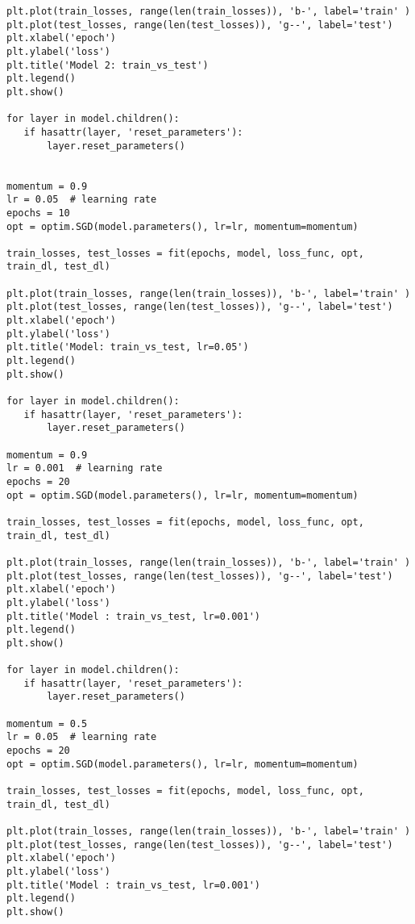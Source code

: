 \documentclass[12pt]{article}%
\begin{document}
\begin{lstlisting}
plt.plot(train_losses, range(len(train_losses)), 'b-', label='train' )
plt.plot(test_losses, range(len(test_losses)), 'g--', label='test')
plt.xlabel('epoch')
plt.ylabel('loss')
plt.title('Model 2: train_vs_test')
plt.legend()
plt.show()

for layer in model.children():
   if hasattr(layer, 'reset_parameters'):
       layer.reset_parameters()


momentum = 0.9
lr = 0.05  # learning rate
epochs = 10
opt = optim.SGD(model.parameters(), lr=lr, momentum=momentum)

train_losses, test_losses = fit(epochs, model, loss_func, opt, train_dl, test_dl)

plt.plot(train_losses, range(len(train_losses)), 'b-', label='train' )
plt.plot(test_losses, range(len(test_losses)), 'g--', label='test')
plt.xlabel('epoch')
plt.ylabel('loss')
plt.title('Model: train_vs_test, lr=0.05')
plt.legend()
plt.show()

for layer in model.children():
   if hasattr(layer, 'reset_parameters'):
       layer.reset_parameters()

momentum = 0.9
lr = 0.001  # learning rate
epochs = 20
opt = optim.SGD(model.parameters(), lr=lr, momentum=momentum)

train_losses, test_losses = fit(epochs, model, loss_func, opt, train_dl, test_dl)

plt.plot(train_losses, range(len(train_losses)), 'b-', label='train' )
plt.plot(test_losses, range(len(test_losses)), 'g--', label='test')
plt.xlabel('epoch')
plt.ylabel('loss')
plt.title('Model : train_vs_test, lr=0.001')
plt.legend()
plt.show()

for layer in model.children():
   if hasattr(layer, 'reset_parameters'):
       layer.reset_parameters()

momentum = 0.5
lr = 0.05  # learning rate
epochs = 20
opt = optim.SGD(model.parameters(), lr=lr, momentum=momentum)

train_losses, test_losses = fit(epochs, model, loss_func, opt, train_dl, test_dl)

plt.plot(train_losses, range(len(train_losses)), 'b-', label='train' )
plt.plot(test_losses, range(len(test_losses)), 'g--', label='test')
plt.xlabel('epoch')
plt.ylabel('loss')
plt.title('Model : train_vs_test, lr=0.001')
plt.legend()
plt.show()
\end{lstlisting}
\end{document}
